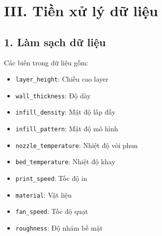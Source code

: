 \section{III. Tiền xử lý dữ liệu}
\label{iii.-tiux1ec1n-xux1eed-luxfd-dux1eef-liux1ec7u}

\begin{Shaded}
\begin{Highlighting}[]
\OtherTok{\textless{}{-}} \NormalTok{(}\SpecialCharTok{\textbackslash{}\textbackslash{}}\SpecialCharTok{\textbackslash{}\textbackslash{}}\SpecialCharTok{\textbackslash{}\textbackslash{}}\SpecialCharTok{\textbackslash{}\textbackslash{}}\SpecialCharTok{\textbackslash{}\textbackslash{}}\SpecialCharTok{\textbackslash{}\textbackslash{}}\SpecialCharTok{\textbackslash{}\textbackslash{}}\SpecialCharTok{\textbackslash{}\textbackslash{}}\NormalTok{, }
 \NormalTok{, } \NormalTok{)}
\end{Highlighting}
\end{Shaded}

\subsection{1. Làm sạch dữ liệu}

Các biến trong dữ liệu gồm:

\begin{itemize}
\tightlist
\item
  \texttt{layer\_height}: Chiều cao layer
\item
  \texttt{wall\_thickness}: Độ dày
\item
  \texttt{infill\_density}: Mật độ lấp đầy
\item
  \texttt{infill\_pattern}: Mật độ mô hình
\item
  \texttt{nozzle\_temperature}: Nhiệt độ vòi phun
\item
  \texttt{bed\_temperature}: Nhiệt độ khay
\item
  \texttt{print\_speed}: Tốc độ in
\item
  \texttt{material}: Vật liệu
\item
  \texttt{fan\_speed}: Tốc độ quạt
\item
  \texttt{roughness}: Độ nhám bề mặt
\end{itemize}

